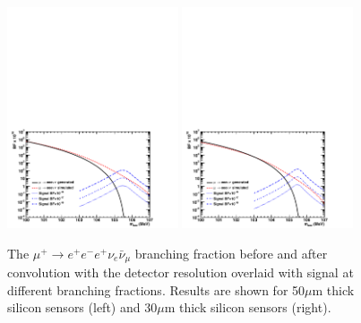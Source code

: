 \begin{figure}[htb]
\begin{center}
\includegraphics[width=0.45\textwidth]{Figures/mu3e-irr.pdf}
\includegraphics[width=0.45\textwidth]{Figures/mu3e-irr2.pdf}
\end{center}
\caption{The $\mu^+ \rightarrow e^+e^-e^+\nu_e \bar\nu_\mu$ branching fraction before and after convolution with the detector resolution overlaid with signal at different branching 
fractions. Results are shown for 50$\mu$m thick silicon sensors (left) and 30$\mu$m thick silicon sensors (right).}
\label{Fig::mu3e3}
\end{figure}

